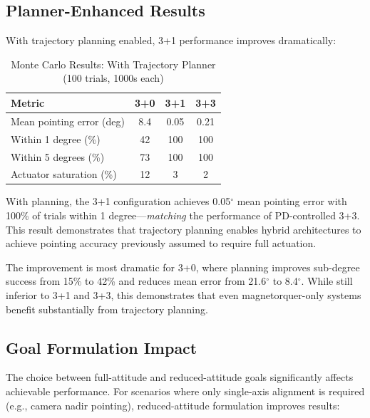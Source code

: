 \documentclass[9pt]{extarticle}
\begin{document}
\subsection{Planner-Enhanced Results}

With trajectory planning enabled, 3+1 performance improves dramatically:

\begin{table}[h]
    \centering
    \caption{Monte Carlo Results: With Trajectory Planner (100 trials, 1000s each)}
    \label{tab:planner_results}
    \begin{tabular}{lccc}
        \toprule
        Metric & 3+0 & 3+1 & 3+3 \\
        \midrule
        Mean pointing error (deg) & 8.4 & 0.05 & 0.21 \\
        Within 1 degree (\%) & 42 & 100 & 100 \\
        Within 5 degrees (\%) & 73 & 100 & 100 \\
        Actuator saturation (\%) & 12 & 3 & 2 \\
        \bottomrule
    \end{tabular}
\end{table}

With planning, the 3+1 configuration achieves 0.05$^\circ$ mean pointing error with 100\% of trials within 1 degree---\emph{matching} the performance of PD-controlled 3+3. This result demonstrates that trajectory planning enables hybrid architectures to achieve pointing accuracy previously assumed to require full actuation.


The improvement is most dramatic for 3+0, where planning improves sub-degree success from 15\% to 42\% and reduces mean error from 21.6$^\circ$ to 8.4$^\circ$. While still inferior to 3+1 and 3+3, this demonstrates that even magnetorquer-only systems benefit substantially from trajectory planning.

\subsection{Goal Formulation Impact}

The choice between full-attitude and reduced-attitude goals significantly affects achievable performance. For scenarios where only single-axis alignment is required (e.g., camera nadir pointing), reduced-attitude formulation improves results:
\end{document}
